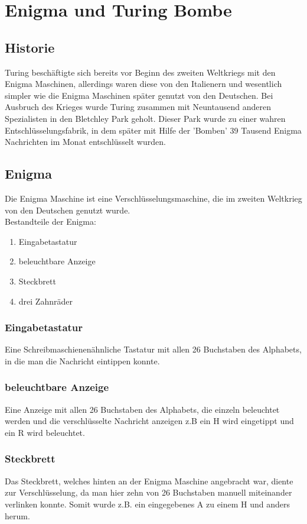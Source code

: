 \section{Enigma und Turing Bombe}

\subsection{Historie}
Turing beschäftigte sich bereits vor Beginn des zweiten Weltkriegs mit den Enigma Maschinen, allerdings waren diese von den Italienern und wesentlich simpler wie die Enigma Maschinen später genutzt von den Deutschen. 
Bei Ausbruch des Krieges wurde Turing zusammen mit Neuntausend anderen Spezialisten in den Bletchley Park geholt. Dieser Park wurde zu einer wahren Entschlüsselungsfabrik, in dem später mit Hilfe der 'Bomben' 39 Tausend Enigma Nachrichten im Monat entschlüsselt wurden.

\subsection{Enigma}
Die Enigma Maschine ist eine Verschlüsselungsmaschine, die im zweiten Weltkrieg von den Deutschen genutzt wurde. \\
Bestandteile der Enigma:
\begin{enumerate}
\item Eingabetastatur
\item beleuchtbare Anzeige
\item Steckbrett
\item drei Zahnräder
\end{enumerate}

\subsubsection{Eingabetastatur}
Eine Schreibmaschienenähnliche Tastatur mit allen 26 Buchstaben des Alphabets, in die man die Nachricht eintippen konnte.

\subsubsection{beleuchtbare Anzeige}
Eine Anzeige mit allen 26 Buchstaben des Alphabets, die einzeln beleuchtet werden und die verschlüsselte Nachricht anzeigen z.B ein H wird eingetippt und ein R wird beleuchtet.

\subsubsection{Steckbrett}
Das Steckbrett, welches hinten an der Enigma Maschine angebracht war, diente zur Verschlüsselung, da man hier zehn von 26 Buchstaben manuell miteinander verlinken konnte. Somit wurde z.B. ein eingegebenes A zu einem H und anders herum.

